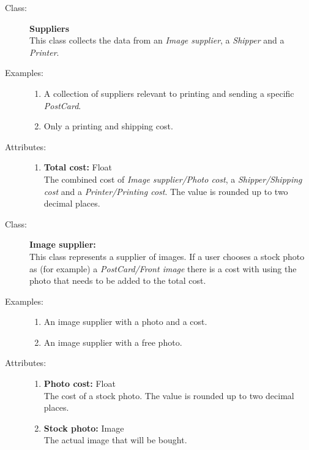\documentclass[10pt,a4paper]{article}
\begin{document}
\hrulefill

\begin{description}
\item[Class:] \textbf{Suppliers} \hfill \\
This class collects the data from an \textit{Image supplier}, a \textit{Shipper} and a \textit{Printer}. 

\item[Examples:] \hfill
\begin{enumerate}
\item A collection of suppliers relevant to printing and sending a specific \textit{PostCard}.
\item Only a printing and shipping cost.
\end{enumerate}

\item[Attributes:] \hfill
\begin{enumerate}
\item \textbf{Total cost:} Float \hfill \\The combined cost of \textit{Image supplier/Photo cost}, a \textit{Shipper/Shipping cost} and a \textit{Printer/Printing cost}. The value is rounded up to two decimal places.
\end{enumerate}
\end{description}

\hrulefill

\begin{description}
\item[Class:] \textbf{Image supplier:} \hfill \\
This class represents a supplier of images. If a user chooses a stock photo as (for example) a \textit{PostCard/Front image} there is a cost with using the photo that needs to be added to the total cost.

\item[Examples:] \hfill
\begin{enumerate}
\item An image supplier with a photo and a cost.
\item An image supplier with a free photo.
\end{enumerate}

\item[Attributes:] \hfill
\begin{enumerate}
\item \textbf{Photo cost:} Float \hfill \\The cost of a stock photo. The value is rounded up to two decimal places.
\item \textbf{Stock photo:} Image \hfill \\The actual image that will be bought.
\end{enumerate}
\end{description}
\end{document}
